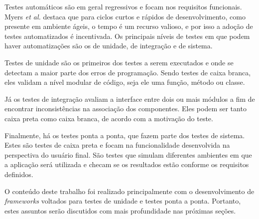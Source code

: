 Testes automáticos são em geral regressivos e focam nos requisitos funcionais. Myers \emph{et al.} \cite{myers} destaca que para ciclos curtos e rápidos de desenvolvimento, como presente em ambiente ágeis, o tempo é um recurso valioso, e por isso a adoção de testes automatizados é incentivada. Os principais níveis de testes em que podem haver automatizações são os de unidade, de integração e de sistema.

Testes de unidade são os primeiros dos testes a serem executados e onde se detectam a maior parte dos erros de programação. Sendo testes de caixa branca, eles validam a nível modular de código, seja ele uma função, método ou classe.

Já os testes de integração avaliam a interface entre dois ou mais módulos a fim de encontrar inconsistências na associação dos componentes. Eles podem ser tanto caixa preta como caixa branca, de acordo com a motivação do teste.

Finalmente, há os testes ponta a ponta, que fazem parte dos testes de sistema. Estes são testes de caixa preta e focam na funcionalidade desenvolvida na perspectiva do usuário final. São testes que simulam diferentes ambientes em que a aplicação será utilizada e checam se os resultados estão conforme os requisitos definidos.

O conteúdo deste trabalho foi realizado principalmente com o desenvolvimento de \emph{frameworks} voltados para testes de unidade e testes ponta a ponta. Portanto, estes assuntos serão discutidos com mais profundidade nas próximas seções.
